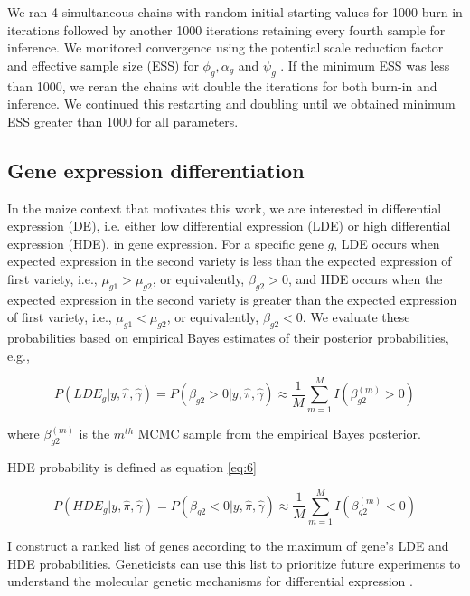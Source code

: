 \documentclass[11pt]{isuthesis}
\begin{document}
We ran 4 simultaneous chains with random initial starting values for 1000 burn-in iterations followed by another 1000 iterations retaining every fourth sample for inference. We monitored convergence using the potential scale reduction factor and effective sample size (ESS) for $\phi_g, \alpha_g$ and $\psi_g$ \citep{gelman1992inference}. If the minimum ESS was less than 1000, we reran the chains wit double the iterations for both burn-in and inference. We continued this restarting and doubling until we obtained minimum ESS greater than 1000 for all parameters. 

\subsection{Gene expression differentiation}

In the maize context that motivates this work, we are interested in differential expression (DE), i.e. either low differential expression (LDE) or high differential expression (HDE), in gene expression. For a specific gene $g$, LDE occurs when expected expression in the second variety is less than the expected expression of first variety, i.e., $\mu_{g1} > \mu_{g2}$, or equivalently, $\beta_{g2}>0$, and HDE occurs when the expected expression in the second variety is greater than the expected expression of first variety, i.e., $\mu_{g1} < \mu_{g2}$, or equivalently, $\beta_{g2}<0$. We evaluate these probabilities based on empirical Bayes estimates of their posterior probabilities, e.g., 

\begin{equation}
\label{eq:5}
P(LDE_g | y, \hat{\pi}, \hat{\gamma}) = P(\beta_{g2}>0 | y, \hat{\pi}, \hat{\gamma}) \approx \frac{1}{M} \sum_{m=1}^M I(\beta_{g2} ^ {(m)}>0)
\end{equation}

where $\beta_{g2}^{(m)}$ is the $m^{th}$ MCMC sample from the empirical Bayes posterior.

HDE probability is defined as equation \ref{eq:6}

\begin{equation}
\label{eq:6}
P(HDE_g | y, \hat{\pi}, \hat{\gamma}) = P(\beta_{g2}<0 | y, \hat{\pi}, \hat{\gamma}) \approx \frac{1}{M} \sum_{m=1}^M I(\beta_{g2} ^ {(m)}<0)
\end{equation}

I construct a ranked list of genes according to the maximum of gene's LDE and HDE probabilities. Geneticists can use this list to prioritize future experiments to understand the molecular genetic mechanisms for differential expression \citep{niemi2015empirical}. 
\end{document}
